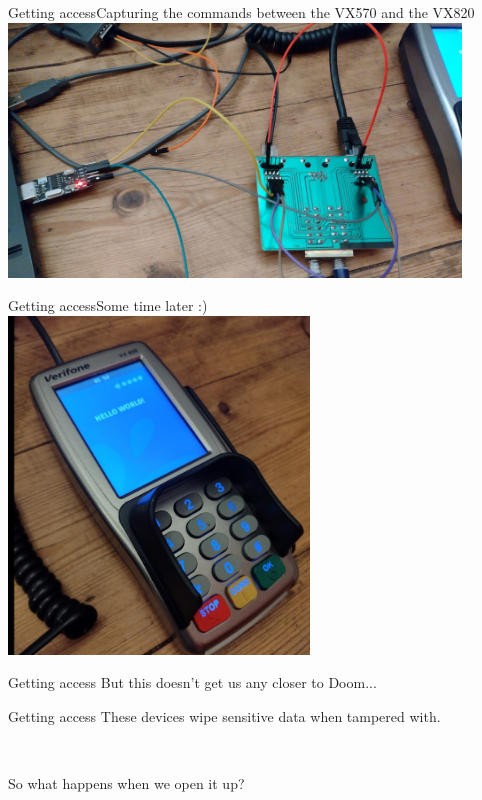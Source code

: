 \documentclass[12pt,aspectratio=169]{beamer}
\begin{document}
\begin{frame}{Getting access}{Capturing the commands between the VX570 and the VX820}
	\centering
	\includegraphics[width=0.9\textwidth]{media/intercept_serial}
\end{frame}

\begin{frame}{Getting access}{Some time later :)}
	\centering
	\includegraphics[width=8cm]{media/ccv_hello_world}
\end{frame}


\begin{frame}{Getting access}
	But this doesn't get us any closer to Doom...
\end{frame}


\begin{frame}{Getting access}
	These devices wipe sensitive data when tampered with.

	~

	So what happens when we open it up?
\end{frame}


\end{document}
